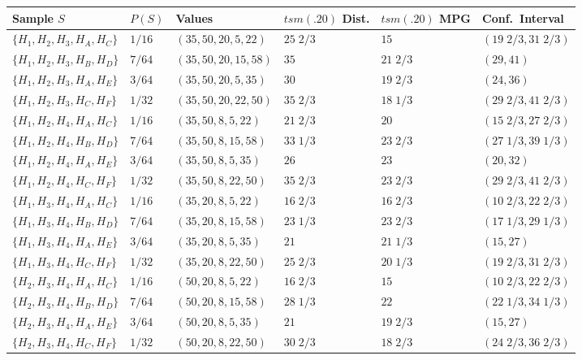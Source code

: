 \documentclass[12pt]{article}
\begin{document}
\begin{center}
\begin{tabular}{llllll}
\toprule
Sample $S$ & $P(S)$ & Values & $tsm(.20)$ Dist. & $tsm(.20)$ MPG & Conf.\ Interval \\
\midrule
$\{H_1,H_2,H_3,H_A,H_C\}$ & $1/16$ & $(35,50,20,5,22)$ & $25\;2/3$ & $15$ & $(19\;2/3,31\;2/3)$ \\
$\{H_1,H_2,H_3,H_B,H_D\}$ & $7/64$ & $(35,50,20,15,58)$ & $35$ & $21\;2/3$ & $(29,41)$ \\
$\{H_1,H_2,H_3,H_A,H_E\}$ & $3/64$ & $(35,50,20,5,35)$ & $30$ & $19\;2/3$ & $(24,36)$ \\
$\{H_1,H_2,H_3,H_C,H_F\}$ & $1/32$ & $(35,50,20,22,50)$ & $35\;2/3$ & $18\;1/3$ & $(29\;2/3,41\;2/3)$ \\

$\{H_1,H_2,H_4,H_A,H_C\}$ & $1/16$ & $(35,50,8,5,22)$ & $21\;2/3$ & $20$ & $(15\;2/3,27\;2/3)$ \\
$\{H_1,H_2,H_4,H_B,H_D\}$ & $7/64$ & $(35,50,8,15,58)$ & $33\;1/3$ & $23\;2/3$ & $(27\;1/3,39\;1/3)$ \\
$\{H_1,H_2,H_4,H_A,H_E\}$ & $3/64$ & $(35,50,8,5,35)$ & $26$ & $23$ & $(20,32)$ \\
$\{H_1,H_2,H_4,H_C,H_F\}$ & $1/32$ & $(35,50,8,22,50)$ & $35\;2/3$ & $23\;2/3$ & $(29\;2/3,41\;2/3)$ \\

$\{H_1,H_3,H_4,H_A,H_C\}$ & $1/16$ & $(35,20,8,5,22)$ & $16\;2/3$ & $16\;2/3$ & $(10\;2/3,22\;2/3)$ \\
$\{H_1,H_3,H_4,H_B,H_D\}$ & $7/64$ & $(35,20,8,15,58)$ & $23\;1/3$ & $23\;2/3$ & $(17\;1/3,29\;1/3)$ \\
$\{H_1,H_3,H_4,H_A,H_E\}$ & $3/64$ & $(35,20,8,5,35)$ & $21$ & $21\;1/3$ & $(15,27)$ \\
$\{H_1,H_3,H_4,H_C,H_F\}$ & $1/32$ & $(35,20,8,22,50)$ & $25\;2/3$ & $20\;1/3$ & $(19\;2/3,31\;2/3)$ \\

$\{H_2,H_3,H_4,H_A,H_C\}$ & $1/16$ & $(50,20,8,5,22)$ & $16\;2/3$ & $15$ & $(10\;2/3,22\;2/3)$ \\
$\{H_2,H_3,H_4,H_B,H_D\}$ & $7/64$ & $(50,20,8,15,58)$ & $28\;1/3$ & $22$ & $(22\;1/3,34\;1/3)$ \\
$\{H_2,H_3,H_4,H_A,H_E\}$ & $3/64$ & $(50,20,8,5,35)$ & $21$ & $19\;2/3$ & $(15,27)$ \\
$\{H_2,H_3,H_4,H_C,H_F\}$ & $1/32$ & $(50,20,8,22,50)$ & $30\;2/3$ & $18\;2/3$ & $(24\;2/3,36\;2/3)$ \\
\bottomrule
\end{tabular}
\end{center}
\end{document}
